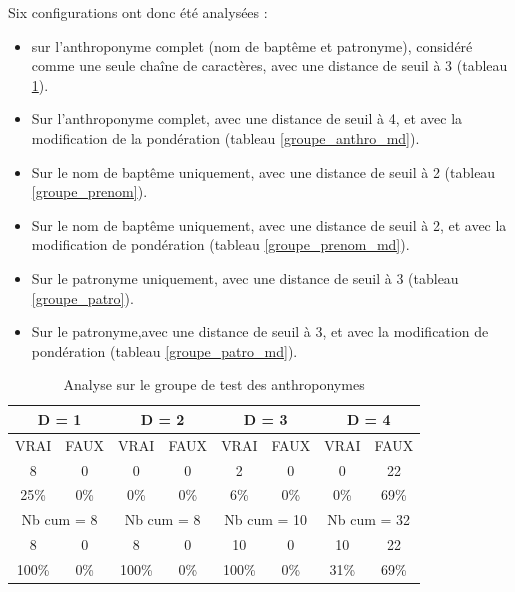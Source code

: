 Six configurations ont donc été analysées :
\begin{itemize}
    \item sur l'anthroponyme complet (nom de baptême et patronyme), considéré comme une seule chaîne de caractères, avec une distance de seuil à 3 (tableau \ref{groupe_anthro}).
    \item Sur l'anthroponyme complet, avec une distance de seuil à 4, et avec la modification de la pondération (tableau \ref{groupe_anthro_md}).
    \item Sur le nom de baptême uniquement, avec une distance de seuil à 2 (tableau \ref{groupe_prenom}).
    \item Sur le nom de baptême uniquement, avec une distance de seuil à 2, et avec la modification de pondération (tableau \ref{groupe_prenom_md}).
    \item Sur le patronyme uniquement, avec une distance de seuil à 3 (tableau \ref{groupe_patro}).
    \item Sur le patronyme,avec une distance de seuil à 3, et avec la modification de pondération (tableau \ref{groupe_patro_md}).
\end{itemize}
\vspace{0,5cm}



\renewcommand{\arraystretch} {1.25}
\begin{table}[ht]
    \centering
    \begin{tabular}{|c|c|c|c|c|c|c|c|}
        \hline \multicolumn{2}{|c}{D = 1}& \multicolumn{2}{|c}{D = 2} & \multicolumn{2}{|c}{D = 3} & \multicolumn{2}{|c|}{D = 4} \\
        \hline VRAI & FAUX & VRAI & FAUX & VRAI & FAUX & VRAI & FAUX \\
        \hline \hline  8 & 0 & 0 & 0 & 2 & 0 & 0 & 22 \\
        \hline 25\% & 0\% & 0\% & 0\% & 6\% & 0\% & 0\% & 69\%  \\
        \hline \hline \multicolumn{2}{|c}{Nb cum = 8 }& \multicolumn{2}{|c|}{Nb cum = 8 } & \multicolumn{2}{c|}{Nb cum = 10} & \multicolumn{2}{c|}{Nb cum = 32} \\
        \hline \hline  8 & 0 & 8 & 0 & 10 & 0 & 10 & 22 \\
        \hline 100\% & 0\% & 100\% & 0\% & 100\% & 0\% & 31\% & 69\%  \\
        \hline 
    \end{tabular}
    \caption{Analyse sur le groupe de test des anthroponymes }
    \label{groupe_anthro}
\end{table}

